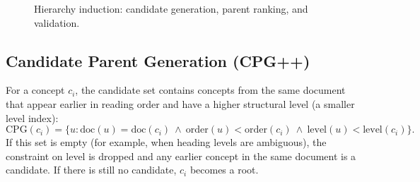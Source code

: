 \documentclass[12pt,a4paper,twoside,openright]{report}
\begin{document}
\begin{figure}[!htbp]
\centering
{}
\caption{Hierarchy induction: candidate generation, parent ranking, and validation.}
\label{fig:hier}
\end{figure}

\subsection{Candidate Parent Generation (CPG++)}
For a concept $c_i$, the candidate set contains concepts from the same document that
appear earlier in reading order and have a higher structural level (a smaller level
index):
\begin{equation}
\text{CPG}(c_i)=\{u : \text{doc}(u)=\text{doc}(c_i)\ \wedge\ \text{order}(u)<\text{order}(c_i)\ \wedge\ \text{level}(u)<\text{level}(c_i)\}.
\end{equation}
If this set is empty (for example, when heading levels are ambiguous), the constraint on
level is dropped and any earlier concept in the same document is a candidate. If there
is still no candidate, $c_i$ becomes a root.
\end{document}
